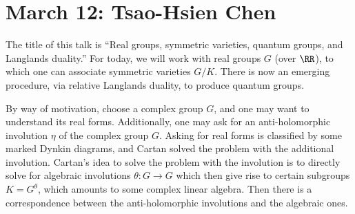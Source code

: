 \documentclass{article}
\begin{document}
\section{March 12: Tsao-Hsien Chen}
The title of this talk is ``Real groups, symmetric varieties, quantum groups, and Langlands duality.''
For today, we will work with real groups $G$ (over $\RR$), to which one can associate symmetric varieties $G/K$. There is now an emerging procedure, via relative Langlands duality, to produce quantum groups.

By way of motivation, choose a complex group $G$, and one may want to understand its real forms. Additionally, one may ask for an anti-holomorphic involution $\eta$ of the complex group $G$. Asking for real forms is classified by some marked Dynkin diagrams, and Cartan solved the problem with the additional involution. Cartan's idea to solve the problem with the involution is to directly solve for algebraic involutions $\theta\colon G\to G$ which then give rise to certain subgroups $K=G^\theta$, which amounts to some complex linear algebra. Then there is a correspondence between the anti-holomorphic involutions and the algebraic ones.
\end{document}
